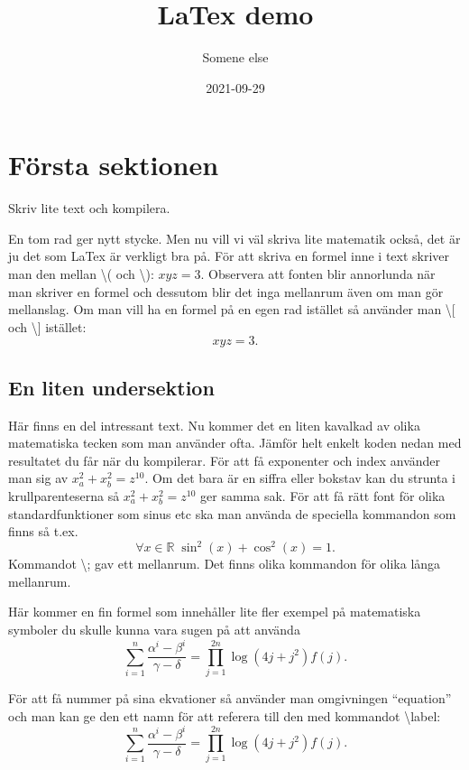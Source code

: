 \documentclass{article}
\title{LaTex demo}
\author{Somene else}
\date{2021-09-29}
\begin{document}
\maketitle


\section{Första sektionen}

Skriv lite text och kompilera.

En tom rad ger nytt stycke. Men nu vill vi väl skriva lite matematik också,
det är ju det som LaTex är verkligt bra på. För att skriva en formel inne i text
skriver man den mellan \textbackslash( och \textbackslash): \( x y z=3 \). Observera
att fonten blir annorlunda när man skriver en formel och dessutom blir det 
inga mellanrum även om man gör mellanslag. Om man vill ha en formel på en egen
rad istället så använder man  \textbackslash [ och \textbackslash ] istället:
\[
x y z = 3.
\]

\subsection{En liten undersektion}
Här finns en del intressant text. Nu kommer det en liten kavalkad av olika
matematiska tecken som man använder ofta. Jämför helt enkelt koden nedan med
resultatet du får när du kompilerar. För att få exponenter och index använder
man sig av \(x_{a}^{2} + x_{b}^{2} = z^{10}\). Om det bara är en siffra eller
bokstav kan du strunta i krullparenteserna så \(x_a^2 + x_b^2 = z^{10}\)
ger samma sak. För att få rätt font för olika standardfunktioner som sinus etc ska man använda de
speciella kommandon som finns så t.ex. 
\[
\forall x\in\mathbb{R}\; \sin^2(x)+\cos^2(x) = 1.
\]
Kommandot \textbackslash; gav ett mellanrum. Det finns olika kommandon för 
olika långa mellanrum.

Här kommer en fin formel som innehåller lite fler exempel på matematiska
symboler du skulle kunna vara sugen på att använda
\[
\sum_{i=1}^n \frac{\alpha^i-\beta^i}{\gamma - \delta} = \prod_{j=1}^{2n}
\log(4j + j^2) f(j).
\]

För att få nummer på sina ekvationer så använder man omgivningen ``equation''
och man kan ge den ett namn för att referera till den med kommandot 
\textbackslash label:
\begin{equation}
  \label{eq:nummer1}
\sum_{i=1}^n \frac{\alpha^i-\beta^i}{\gamma - \delta} = \prod_{j=1}^{2n}
\log(4j + j^2) f(j).  
\end{equation}
\end{document}
